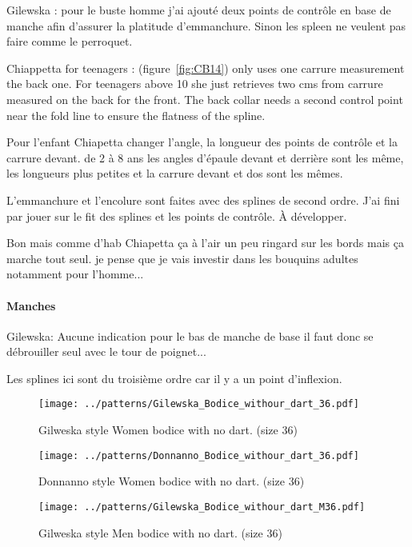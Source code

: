 \documentclass[11pt,a4paper]{article}
\begin{document}
Gilewska : pour le buste homme j'ai ajouté  deux points de contrôle 
en base de manche  afin d'assurer la platitude d'emmanchure. Sinon les 
spleen ne veulent pas faire comme le perroquet.


Chiappetta for teenagers :  (figure~\ref{fig:CB14}) only uses one carrure measurement the back one. For teenagers above 10 she just retrieves two cms from  carrure measured on the back for the front. The back collar needs a second control point near the fold line to ensure the flatness of the spline.

Pour l'enfant Chiapetta changer l'angle, la longueur des points de contrôle et la carrure devant. de 2 à 8 ans les angles d'épaule devant et derrière sont les même, les longueurs plus petites et la carrure devant et dos sont les mêmes.

L'emmanchure et l'encolure sont faites avec des splines de second ordre. J'ai fini par jouer sur le fit des splines et les points de contrôle. À développer.

Bon mais comme d'hab Chiapetta ça à l'air un peu ringard sur les bords mais ça marche tout seul. je pense que je vais investir dans 
les bouquins adultes notamment pour l'homme...


\paragraph{Manches}
Gilewska: Aucune indication pour le bas de manche de base il faut donc 
se débrouiller seul avec le tour de poignet... 

Les splines ici sont du troisième ordre car il y a un point d'inflexion. 

\begin{figure}[hbtp]
\centering
\texttt{[image: ../patterns/Gilewska\_Bodice\_withour\_dart\_36.pdf]}
\caption{Gilweska style Women bodice with no dart. (size 36)}
\end{figure}

\begin{figure}[hbtp]
\centering
\texttt{[image: ../patterns/Donnanno\_Bodice\_withour\_dart\_36.pdf]}
\caption{Donnanno style Women bodice with no dart. (size 36)}
\end{figure}

\begin{figure}[hbtp]
\centering
\texttt{[image: ../patterns/Gilewska\_Bodice\_withour\_dart\_M36.pdf]}
\caption{Gilweska style Men bodice with no dart. (size 36)}
\end{figure}
\end{document}

